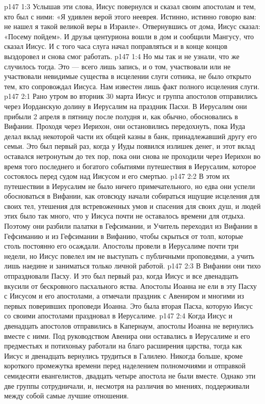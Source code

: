 \vs p147 1:3 Услышав эти слова, Иисус повернулся и сказал своим апостолам и тем, кто был с ними: «Я удивлен верой этого нееврея. Истинно, истинно говорю вам: не нашел я такой великой веры в Израиле». Отвернувшись от дома, Иисус сказал: «Посему пойдем». И друзья центуриона вошли в дом и сообщили Мангусу, что сказал Иисус. И с того часа слуга начал поправляться и в конце концов выздоровел и снова смог работать.
\vs p147 1:4 Но мы так и не узнали, что же случилось тогда. Это --- всего лишь запись, и о том, участвовали или не участвовали невидимые существа в исцелении слуги сотника, не было открыто тем, кто сопровождал Иисуса. Нам известен лишь факт полного исцеления слуги.
\vs p147 2:1 Рано утром во вторник 30 марта Иисус и группа апостолов отправились через Иорданскую долину в Иерусалим на праздник Пасхи. В Иерусалим они прибыли 2 апреля в пятницу после полудня и, как обычно, обосновались в Вифании. Проходя через Иерихон, они остановились передохнуть, пока Иуда делал вклад некоторой части их общей казны в банк, принадлежавший другу его семьи. Это был первый раз, когда у Иуды появился излишек денег, и этот вклад оставался нетронутым до тех пор, пока они снова не проходили через Иерихон во время того последнего и богатого событиями путешествия в Иерусалим, которое состоялось перед судом над Иисусом и его смертью.
\vs p147 2:2 В этом их путешествии в Иерусалим не было ничего примечательного, но едва они успели обосноваться в Вифании, как отовсюду начали собираться ищущие исцеления для своих тел, утешения для встревоженных умов и спасения для своих душ, и людей этих было так много, что у Иисуса почти не оставалось времени для отдыха. Поэтому они разбили палатки в Гефсимании, и Учитель переходил из Вифании в Гефсиманию и из Гефсимании в Вифанию, чтобы скрыться от толп, которые столь постоянно его осаждали. Апостолы провели в Иерусалиме почти три недели, но Иисус повелел им не выступать с публичными проповедями, а учить лишь наедине и заниматься только личной работой.
\vs p147 2:3 В Вифании они тихо отпраздновали Пасху. И это был первый раз, когда Иисус и все двенадцать вкусили от бескровного пасхального яства. Апостолы Иоанна не ели в эту Пасху с Иисусом и его апостолами, а отмечали праздник с Авениром и многими из первых поверивших проповеди Иоанна. Это была вторая Пасха, которую Иисус со своими апостолами праздновал в Иерусалиме.
\vs p147 2:4 Когда Иисус и двенадцать апостолов отправились в Капернаум, апостолы Иоанна не вернулись вместе с ними. Под руководством Авенира они оставались в Иерусалиме и его предместьях и потихоньку работали на благо расширения царства, тогда как Иисус и двенадцать вернулись трудиться в Галилею. Никогда больше, кроме короткого промежутка времени перед наделением полномочиями и отправкой семидесяти евангелистов, двадцать четыре апостола не были вместе. Однако эти две группы сотрудничали, и, несмотря на различия во мнениях, поддерживали между собой самые лучшие отношения.
